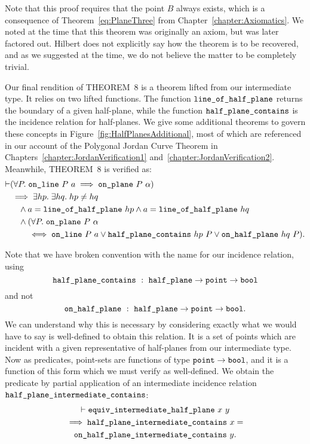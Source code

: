 Note that this proof requires that the point $B$ always exists, which is a consequence of Theorem~\ref{eq:PlaneThree} from Chapter~\ref{chapter:Axiomatics}. We noted at the time that this theorem was originally an axiom, but was later factored out. Hilbert does not explicitly say how the theorem is to be recovered, and as we suggested at the time, we do not believe the matter to be completely trivial.

Our final rendition of THEOREM~8 is a theorem lifted from our intermediate type. It relies on two lifted functions. The function $\texttt{line\_of\_half\_plane}$ returns the boundary of a given half-plane, while the function $\texttt{half\_plane\_contains}$ is the incidence relation for half-planes. We give some additional theorems to govern these concepts in Figure~\ref{fig:HalfPlanesAdditional}, most of which are referenced in our  account of the Polygonal Jordan Curve Theorem in Chapters~\ref{chapter:JordanVerification1} and~\ref{chapter:JordanVerification2}. Meanwhile, THEOREM~8 is verified as:
\begin{equation}\label{eq:HalfPlaneCover}
  \begin{split}
    \vdash&(\forall P.\;\texttt{on\_line}\ P\ a \implies \texttt{on\_plane}\ P\ \alpha)\\
    &\implies \exists hp.\;\exists hq.\; hp \neq hq\\
    &\quad \wedge a = \texttt{line\_of\_half\_plane}\ hp \wedge a = \texttt{line\_of\_half\_plane}\ hq\\
    &\quad \wedge (\forall P.\;\texttt{on\_plane}\ P\ \alpha\\
    &\quad\quad \iff \texttt{on\_line}\ P\ a \vee \texttt{half\_plane\_contains}\ hp\ P \vee \texttt{on\_half\_plane}\ hq\ P).
  \end{split}
\end{equation}

Note that we have broken convention with the name for our incidence relation, using 
\begin{displaymath}
\code{half\_plane\_contains}\ :\ \code{half\_plane}\rightarrow\code{point}\rightarrow\code{bool}
\end{displaymath}
and not 
\begin{displaymath}
\code{on\_half\_plane}\ :\ \code{half\_plane}\rightarrow\code{point}\rightarrow\code{bool}.
\end{displaymath}
We can understand why this is necessary by considering exactly what we would have to say is well-defined to obtain this relation. It is a set of points which are incident with a given representative of half-planes from our intermediate type. Now as predicates, point-sets are functions of type $\texttt{point} \rightarrow \texttt{bool}$, and it is a function of this form which we must verify as well-defined. We obtain the predicate by partial application of an intermediate incidence relation $\texttt{half\_plane\_intermediate\_contains}$:
\begin{multline*}
\vdash\texttt{equiv\_intermediate\_half\_plane}\ x\ y \\
\implies \texttt{half\_plane\_intermediate\_contains}\ x =\\ \texttt{on\_half\_plane\_intermediate\_contains}\ y.
\end{multline*}

